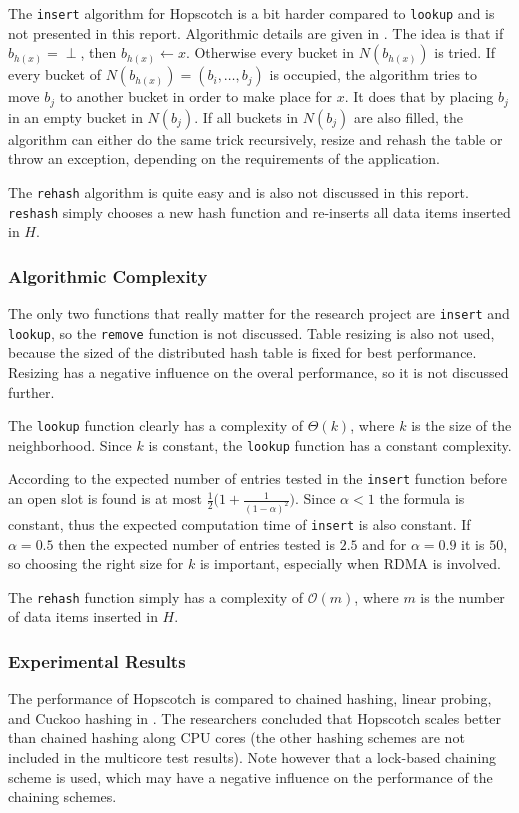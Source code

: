 The \texttt{insert} algorithm for Hopscotch is a bit harder compared to \texttt{lookup} and is not presented in this report. Algorithmic details are given in \cite{hopscotch}. The idea is that if $b_{h(x)} = \perp$, then $b_{h(x)} \gets x$. Otherwise every bucket in $N(b_{h(x)})$ is tried. If every bucket of $N(b_{h(x)}) = (b_i, \dots, b_j)$ is occupied, the algorithm tries to move $b_j$ to another bucket in order to make place for $x$. It does that by placing $b_j$ in an empty bucket in $N(b_j)$. If all buckets in $N(b_j)$ are also filled, the algorithm can either do the same trick recursively, resize and rehash the table or throw an exception, depending on the requirements of the application.

The \texttt{rehash} algorithm is quite easy and is also not discussed in this report. \texttt{reshash} simply chooses a new hash function and re-inserts all data items inserted in $H$.

\subsubsection{Algorithmic Complexity}
The only two functions that really matter for the research project are \texttt{insert} and \texttt{lookup}, so the \texttt{remove} function is not discussed. Table resizing is also not used, because the sized of the distributed hash table is fixed for best performance. Resizing has a negative influence on the overal performance, so it is not discussed further.

The \texttt{lookup} function clearly has a complexity of $\Theta(k)$, where $k$ is the size of the neighborhood. Since $k$ is constant, the \texttt{lookup} function has a constant complexity. 

According to \cite{hopscotch} the expected number of entries tested in the \texttt{insert} function before an open slot is found is at most $\frac{1}{2} \big (1 + \frac{1}{(1 - \alpha)^2} \big )$. Since $\alpha < 1$ the formula is constant, thus the expected computation time of \texttt{insert} is also constant. If $\alpha = 0.5$ then the expected number of entries tested is $2.5$ and for $\alpha = 0.9$ it is $50$, so choosing the right size for $k$ is important, especially when RDMA is involved.

The \texttt{rehash} function simply has a complexity of $\mathcal{O}(m)$, where $m$ is the number of data items inserted in $H$.

\subsubsection{Experimental Results}
The performance of Hopscotch is compared to chained hashing, linear probing, and Cuckoo hashing in \cite{hopscotch}. The researchers concluded that Hopscotch scales better than chained hashing along CPU cores (the other hashing schemes are not included in the multicore test results). Note however that a lock-based chaining scheme is used, which may have a negative influence on the performance of the chaining schemes. 

